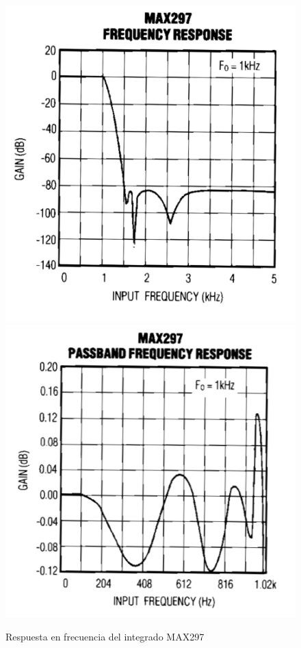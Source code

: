 \documentclass[assd_tp3_main.tex]{subfiles}
\begin{document}
\begin{figure}[H]
\begin{centering}
\includegraphics[scale=0.2]{images/ej1/tf.png}
\includegraphics[scale=0.4]{images/ej1/tfpaso.png}
\par\end{centering}
\caption{Respuesta en frecuencia del integrado MAX297}
\end{figure}
\end{document}
